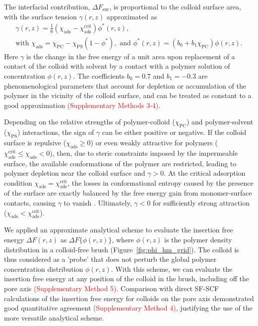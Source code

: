 \documentclass[12pt, a4paper]{article}
\newcommand\todo[1]{\textcolor{red}{#1}}
\begin{document}
The interfacial contribution, $\Delta F_{\text{sur}}$, is proportional to the colloid surface area, with the surface tension $\gamma (r,z)$ approximated as
\begin{gather}
     \gamma (r,z)= \frac{1}{6}(\chi_{\text{ads}} - \chi_{\text{ads}}^{\text{crit}})\phi^{\ast}(r,z),
    \label{eq:chi_ads} 
    \\
    \text{with } \chi_{\text{ads}} = \chi_{\text{PC}} - \chi_{\text{PS}}(1-\phi^{\ast}), \text{ and } \phi^{\ast}(r,z)= (b_{0} + b_{1}\chi_{\text{PC}})\phi(r,z).
    \nonumber
\end{gather}
Here $\gamma$ is the change in the free energy of a unit area upon replacement of a contact of the colloid with solvent by a contact with a polymer solution of concentration $\phi(r,z)$.
The coefficients $b_0 = 0.7$ and $b_1 = -0.3$ are phenomenological parameters that account for depletion or accumulation of the polymer in the vicinity of the colloid surface, and can be treated as constant to a good approximation 
\todo{(Supplementary Methods 3-4)}.


Depending on the relative strengths of polymer-colloid ($\chi_{\text{PC}}$) and polymer-solvent ($\chi_{\text{PS}}$) interactions, the sign of $\gamma$ can be either positive or negative.
If the colloid surface is repulsive ($\chi_{\text{ads}} \geq 0$) or even weakly attractive for polymers ($\chi_{\text{ads}}^{\text{crit}} \leq \chi_{\text{ads}} < 0$), then, due to steric constraints imposed by the impermeable surface, the available conformations of the polymer are restricted, leading to polymer depletion near the colloid surface and $\gamma > 0$.
At the critical adsorption condition $\chi_{\text{ads}} = \chi_{\text{ads}}^{\text{crit}}$, the losses in conformational entropy caused by the presence of the surface are exactly balanced by the free energy gain from monomer-surface contacts, causing $\gamma$ to vanish \cite{Fleer1993,Birshtein1979,Birshtein1983,Eisenriegler1982}.
Ultimately, $\gamma < 0$ for sufficiently strong attraction ($\chi_{\text{ads}} < \chi_{\text{ads}}^{\text{crit}}$).

We applied an approximate analytical scheme to evaluate the insertion free energy $\Delta F(r,z)$ as $\Delta F\{\phi(r,z)\}$, where $\phi(r,z)$ is the polymer density distribution in a colloid-free brush (Figure~\ref{fig:phi_hm_grid}).
The colloid is thus considered as a 'probe' that does not perturb the global polymer concentration distribution $\phi(r,z)$.
With this scheme, we can evaluate the insertion free energy at any position of the colloid in the brush, including off the pore axis 
\todo{(Supplementary Method 5)}.
Comparison with direct SF-SCF calculations of the insertion free energy for colloids on the pore axis demonstrated good quantitative agreement 
\todo{(Supplementary Method 4)},
justifying the use of the more versatile analytical scheme.
\end{document}
